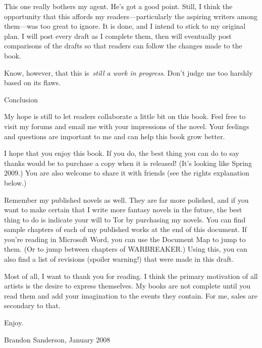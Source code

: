 This one really bothers my agent. He’s got a good point. Still, I think the opportunity that this affords my readers—particularly the aspiring writers among them—was too great to ignore. It is done, and I intend to stick to my original plan. I will post every draft as I complete them, then will eventually post comparisons of the drafts so that readers can follow the changes made to the book.

Know, however, that this is~\textit{still a work in progress}. Don’t judge me too harshly based on its flaws.

Conclusion\textit{}

My hope is still to let readers collaborate a little bit on this book. Feel free to visit my forums and email me with your impressions of the novel. Your feelings and questions are important to me and can help this book grow better.

I hope that you enjoy this book. If you do, the best thing you can do to say thanks would be to purchase a copy when it is released! (It’s looking like Spring 2009.) You are also welcome to share it with friends (see the rights explanation below.)

Remember my published novels as well. They are far more polished, and if you want to make certain that I write more fantasy novels in the future, the best thing to do is indicate your will to Tor by purchasing my novels. You can find sample chapters of each of my published works at the end of this document. If you’re reading in Microsoft Word, you can use the Document Map to jump to them. (Or to jump between chapters of WARBREAKER.) Using this, you can also find a list of revisions (spoiler warning!) that were made in this draft.

Most of all, I want to thank you for reading. I think the primary motivation of all artists is the desire to express themselves. My books are not complete until you read them and add your imagination to the events they contain. For me, sales are secondary to that.

Enjoy.

Brandon Sanderson, January 2008

